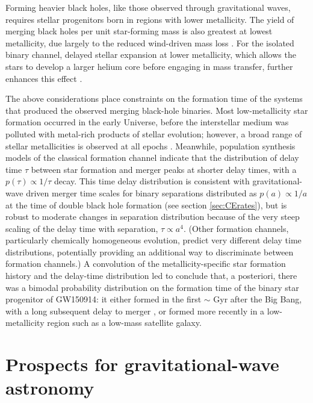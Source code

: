 \documentclass[review]{elsarticle}
\begin{document}
Forming heavier black holes, like those observed through gravitational waves, requires stellar progenitors born in regions with lower metallicity. The yield of merging black holes per unit star-forming mass is also greatest at lowest metallicity, due largely to the reduced wind-driven mass loss \citep[e.g.,][]{Belczynski:2010,Kruckow:2018}. For the isolated binary channel, delayed stellar expansion at lower metallicity, which allows the stars to develop a larger helium core before engaging in mass transfer, further enhances this effect \citep[e.g.,][]{Stevenson:2017}.

The above considerations place constraints on the formation time of the systems that produced the observed merging black-hole binaries. Most low-metallicity star formation occurred in the early Universe, before the interstellar medium was polluted with metal-rich products of stellar evolution; however, a broad range of stellar metallicities is observed at all epochs  \citep[e.g.,][]{LangerNorman:2006,TaylorKobayashi:2015}. Meanwhile, population synthesis models of the classical formation channel indicate that the distribution of delay time $\tau$ between star formation and merger peaks at shorter delay times, with a $p(\tau) \propto 1/\tau$ decay.  This time delay distribution is consistent with gravitational-wave driven merger time scales for binary separations distributed as $p(a) \propto 1/a$ at the time of double black hole formation (see section \ref{sec:CErates}), but  is robust to moderate changes in separation distribution because of the very steep scaling of the delay time with separation, $\tau \propto a^4$.  (Other formation channels, particularly chemically homogeneous evolution, predict very different delay time distributions, potentially providing an additional way to discriminate between formation channels.)  A convolution of the metallicity-specific star formation history and the delay-time distribution led \citet{Belczynski:2016} to conclude that, a posteriori, there was a bimodal probability distribution on the formation time of the binary star progenitor of GW150914: it either formed in the first $\sim$ Gyr after the Big Bang, with a long subsequent delay to merger \citep{Dominik:2014}, or formed more recently in a low-metallicity region such as a low-mass satellite galaxy.  

  

\section{Prospects for gravitational-wave astronomy}\label{prospect}
\end{document}
